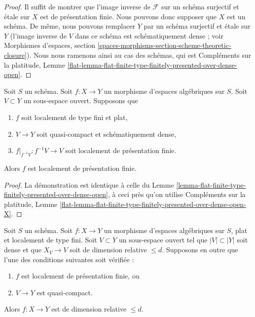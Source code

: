 \begin{proof}
Il suffit de montrer que l'image inverse de $\mathcal{F}$ sur un schéma surjectif
et étale sur $X$ est de présentation finie. Nous pouvons donc supposer que $X$
est un schéma. De même, nous pouvons remplacer $Y$ par un schéma surjectif et
étale sur $Y$ (l'image inverse de $V$ dans ce schéma est schématiquement
dense ; voir
Morphismes d'espaces, section
\ref{spaces-morphisms-section-scheme-theoretic-closure}).
Nous nous ramenons ainsi au cas des schémas, qui est
Compléments sur la platitude, Lemme
\ref{flat-lemma-flat-finite-type-finitely-presented-over-dense-open}.
\end{proof}

\begin{lemma}
\label{lemma-flat-finite-type-finitely-presented-over-dense-open-X}
Soit $S$ un schéma.
Soit $f : X \to Y$ un morphisme d'espaces algébriques sur $S$.
Soit $V \subset Y$ un sous-espace ouvert.
Supposons que
\begin{enumerate}
\item $f$ soit localement de type fini et plat,
\item $V \to Y$ soit quasi-compact et schématiquement dense,
\item $f|_{f^{-1}V} : f^{-1}V \to V$ soit localement de présentation finie.
\end{enumerate}
Alors $f$ est localement de présentation finie.
\end{lemma}

\begin{proof}
La démonstration est identique à celle du
Lemme \ref{lemma-flat-finite-type-finitely-presented-over-dense-open},
à ceci près qu'on utilise
Compléments sur la platitude, Lemme
\ref{flat-lemma-flat-finite-type-finitely-presented-over-dense-open-X}.
\end{proof}

\begin{lemma}
\label{lemma-flat-fp-dimension-over-dense-open}
Soit $S$ un schéma. Soit $f : X \to Y$ un morphisme d'espaces algébriques
sur $S$, plat et localement de type fini. Soit $V \subset Y$ un
sous-espace ouvert tel que $|V| \subset |Y|$ soit dense et que $X_V \to V$
soit de dimension relative $\leq d$. Supposons en outre que l'une des conditions suivantes soit vérifiée :
\begin{enumerate}
\item $f$ est localement de présentation finie, ou
\item $V \to Y$ est quasi-compact.
\end{enumerate}
Alors $f : X \to Y$ est de dimension relative $\leq d$.
\end{lemma}

